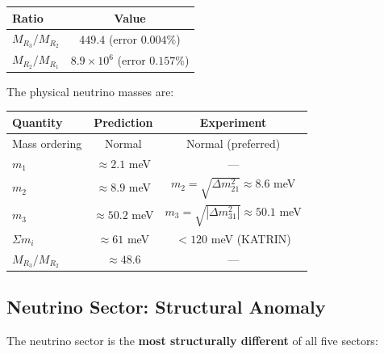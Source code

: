 \begin{center}
\label{tab:nu_majorana}
\begin{tabular}{lc}
\hline\hline
Ratio & Value \\
\hline
$M_{R_3}/M_{R_2}$ & $449.4$ (error $0.004\%$) \\
$M_{R_2}/M_{R_1}$ & $8.9 \times 10^6$ (error $0.157\%$) \\
\hline\hline
\end{tabular}
\end{center}

The physical neutrino masses are:

\begin{center}
\label{tab:nu_masses}
\begin{tabular}{lcc}
\hline\hline
Quantity & Prediction & Experiment \\
\hline
Mass ordering & Normal & Normal (preferred) \\
$m_1$ & $\approx 2.1$ meV & --- \\
$m_2$ & $\approx 8.9$ meV & $m_2 = \sqrt{\Delta m^2_{21}} \approx 8.6$ meV \\
$m_3$ & $\approx 50.2$ meV & $m_3 = \sqrt{|\Delta m^2_{31}|} \approx 50.1$ meV \\
$\Sigma m_i$ & $\approx 61$ meV & $< 120$ meV (KATRIN) \\
$M_{R_3}/M_{R_2}$ & $\approx 48.6$ & --- \\
\hline\hline
\end{tabular}
\end{center}

\subsection{Neutrino Sector: Structural Anomaly}\label{app:nu_anomaly}

The neutrino sector is the \textbf{most structurally different} of all five sectors:

